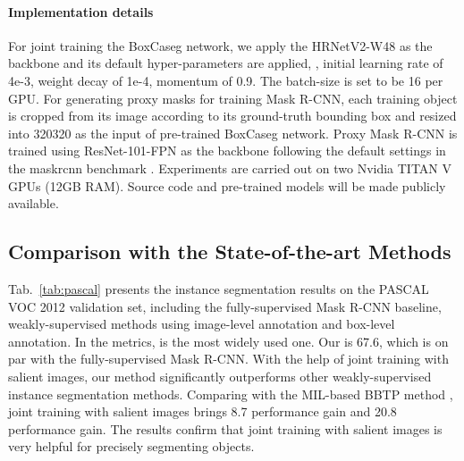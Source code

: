 \documentclass[final]{cvpr}
\begin{document}
\vspace{-3mm}
\paragraph{Implementation details}
\vspace{-1mm}

For joint training the BoxCaseg network, we apply the HRNetV2-W48 \cite{wang2020deep} as the backbone and its default hyper-parameters are applied, \ie, initial learning rate of 4e-3, weight decay of 1e-4, momentum of 0.9. The batch-size is set to be 16 per GPU. For generating proxy masks for training Mask R-CNN, each training object is cropped from its image according to its ground-truth bounding box and resized into 320320 as the input of pre-trained BoxCaseg network. Proxy Mask R-CNN is trained using ResNet-101-FPN \cite{he2016deep} as the backbone following the default settings in the maskrcnn benchmark \cite{massa2018mrcnn}. Experiments are carried out on two Nvidia TITAN V GPUs (12GB RAM). Source code and pre-trained models will be made publicly available.




\vspace{-1mm}
\subsection{Comparison with the State-of-the-art Methods}
\vspace{-1mm}

Tab.~\ref{tab:pascal} presents the instance segmentation results on the PASCAL VOC 2012 validation set, including the fully-supervised Mask R-CNN baseline, weakly-supervised methods using image-level annotation and box-level annotation. In the metrics,  is the most widely used one. Our  is 67.6, which is on par with the fully-supervised Mask R-CNN. With the help of joint training with salient images, our method significantly outperforms other weakly-supervised instance segmentation methods. Comparing with the MIL-based BBTP method \cite{hsu2019weakly}, joint training with salient images brings 8.7  performance gain and 20.8  performance gain. The results confirm that joint training with salient images is very helpful for precisely segmenting objects.
\end{document}
